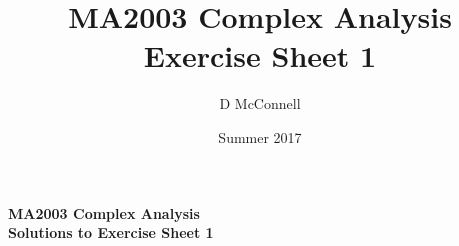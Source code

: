 \documentclass[oneside, 11pt]{article}
\title{MA2003 Complex Analysis Exercise Sheet 1}
\author{D McConnell}
\date{Summer 2017}
\begin{document}
\begin{center}
{
\large\bf
MA2003 Complex Analysis \\
Solutions to Exercise Sheet 1 \\
}
\end{center}

\end{document}
